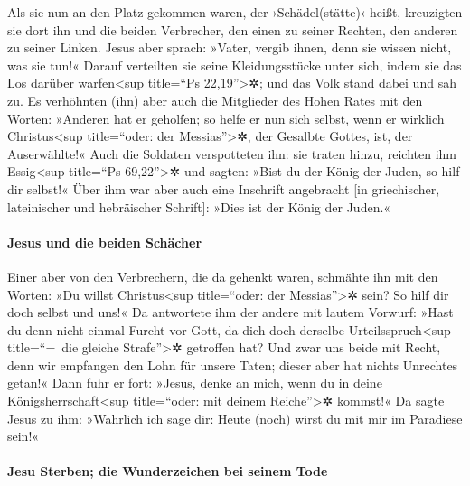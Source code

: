  Als sie nun an den Platz gekommen waren, der
›Schädel(stätte)‹ heißt, kreuzigten sie dort ihn und die beiden
Verbrecher, den einen zu seiner Rechten, den anderen zu seiner Linken.
 Jesus aber sprach: »Vater, vergib ihnen, denn sie wissen
nicht, was sie tun!« Darauf verteilten sie seine Kleidungsstücke unter
sich, indem sie das Los darüber warfen\textless sup title=``Ps
22,19''\textgreater✲;  und das Volk stand dabei und sah
zu. Es verhöhnten (ihn) aber auch die Mitglieder des Hohen Rates mit den
Worten: »Anderen hat er geholfen; so helfe er nun sich selbst, wenn er
wirklich Christus\textless sup title=``oder: der Messias''\textgreater✲,
der Gesalbte Gottes, ist, der Auserwählte!«  Auch die
Soldaten verspotteten ihn: sie traten hinzu, reichten ihm
Essig\textless sup title=``Ps 69,22''\textgreater✲  und
sagten: »Bist du der König der Juden, so hilf dir selbst!«
 Über ihm war aber auch eine Inschrift angebracht {[}in
griechischer, lateinischer und hebräischer Schrift{]}: »Dies ist der
König der Juden.«

\hypertarget{jesus-und-die-beiden-schuxe4cher}{%
\paragraph{Jesus und die beiden
Schächer}\label{jesus-und-die-beiden-schuxe4cher}}

 Einer aber von den Verbrechern, die da gehenkt waren,
schmähte ihn mit den Worten: »Du willst Christus\textless sup
title=``oder: der Messias''\textgreater✲ sein? So hilf dir doch selbst
und uns!«  Da antwortete ihm der andere mit lautem
Vorwurf: »Hast du denn nicht einmal Furcht vor Gott, da dich doch
derselbe Urteilsspruch\textless sup title=``=~die gleiche
Strafe''\textgreater✲ getroffen hat?  Und zwar uns beide
mit Recht, denn wir empfangen den Lohn für unsere Taten; dieser aber hat
nichts Unrechtes getan!«  Dann fuhr er fort: »Jesus,
denke an mich, wenn du in deine Königsherrschaft\textless sup
title=``oder: mit deinem Reiche''\textgreater✲ kommst!« 
Da sagte Jesus zu ihm: »Wahrlich ich sage dir: Heute (noch) wirst du mit
mir im Paradiese sein!«

\hypertarget{jesu-sterben-die-wunderzeichen-bei-seinem-tode}{%
\paragraph{Jesu Sterben; die Wunderzeichen bei seinem
Tode}\label{jesu-sterben-die-wunderzeichen-bei-seinem-tode}}

